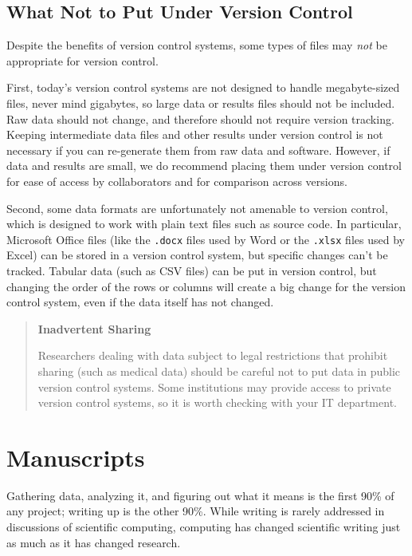 \documentclass[10pt]{article}
\begin{document}
\subsection*{What Not to Put Under Version Control}

Despite the benefits of version control systems, some types of files
may \emph{not} be appropriate for version control.

First, today's version control systems are not designed to handle
megabyte-sized files, never mind gigabytes, so large data or
results files should not be included. Raw data should not change, and
therefore should not require version tracking. Keeping intermediate
data files and other results under version control is not necessary if you
can re-generate them from raw data and
software. However, if data and results are small, we do recommend
placing them under version control for ease of access by collaborators
and for comparison across versions.

Second, some data formats are unfortunately not amenable to version
control, which is designed to work with plain text files such as
source code.  In particular, Microsoft Office files (like the
\texttt{.docx} files used by Word or the \texttt{.xlsx} files used by
Excel) can be stored in a version control system, but specific changes
can't be tracked. Tabular data (such as CSV
files) can be put in version control, but changing the order of the
rows or columns will create a big change for the version control
system, even if the data itself has not changed.

\begin{quote}
  \noindent \textbf{Inadvertent Sharing}

  Researchers dealing with data subject to legal restrictions that
  prohibit sharing (such as medical data) should be careful not to put
  data in public version control systems. Some institutions may
  provide access to private version control systems, so it is worth
  checking with your IT department.
\end{quote}

\section{Manuscripts}\label{sec:manuscripts}

Gathering data, analyzing it, and figuring out what it means is the
first 90\% of any project; writing up is the other 90\%. While writing
is rarely addressed in discussions of scientific computing, computing
has changed scientific writing just as much as it has changed research.
\end{document}
